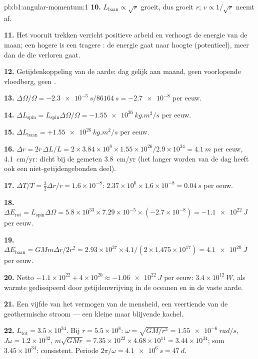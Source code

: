 \begin{solution}{pb:b1:angular-momentum:1}
\textbf{10.} $L_{\text{baan}} \propto \sqrt r$ groeit, dus groeit $r$; $v \propto
1/\sqrt r$ neemt af.

\textbf{11.} Het vooruit trekken verricht positieve arbeid en verhoogt de energie
van de maan; een hogere  is een tragere : de energie gaat naar hoogte
(potentieel), meer dan de  die verloren gaat.

\textbf{12.} Getijdenkoppeling van de aarde: dag gelijk aan maand, geen voorlopende
vloedberg, geen .

\textbf{13.} $\Delta\Omega/\Omega = -\qty{2.3e-3}{s}/\qty{86164}{s} =
\num{-2.7e-8}$ per eeuw.

\textbf{14.} $\Delta L_{\text{spin}} = L_{\text{spin}}\Delta\Omega/\Omega =
\qty{-1.55e26}{kg.m^2/s}$ per eeuw.

\textbf{15.} $\Delta L_{\text{baan}} = +\qty{1.55e26}{kg.m^2/s}$ per eeuw.

\textbf{16.} $\Delta r = 2r\,\Delta L/L = 2 \times 3.84\times10^8 \times 1.55
\times10^{26}/2.9\times10^{34} = \qty{4.1}{m}$ per eeuw, \qty{4.1}{cm/yr}:
dicht bij de gemeten \qty{3.8}{cm/yr} (het langer worden van de dag heeft ook
een niet-getijdengebonden deel).

\textbf{17.} $\Delta T/T = \tfrac32\Delta r/r = 1.6\times10^{-8}$: $2.37\times
10^6 \times 1.6\times10^{-8} = \qty{0.04}{s}$ per eeuw.

\textbf{18.} $\Delta E_{\text{rot}} = L_{\text{spin}}\Delta\Omega = 5.8\times10^{33}
\times 7.29\times10^{-5} \times (-2.7\times10^{-8}) = \qty{-1.1e22}{J}$ per
eeuw.

\textbf{19.} $\Delta E_{\text{baan}} = GMm\Delta r/2r^2 = 2.93\times10^{37}
\times 4.1/(2 \times 1.475\times10^{17}) = \qty{+4.1e20}{J}$ per eeuw.

\textbf{20.} Netto $-1.1\times10^{22} + 4\times10^{20} \approx \qty{-1.06e22}{J}$
per eeuw: $3.4\times10^{12}\ \unit{W}$, als warmte gedissipeerd door getijdenwrijving
in de oceanen en in de vaste aarde.

\textbf{21.} Een vijfde van het vermogen van de mensheid, een veertiende van de
geothermische stroom --- een kleine maar blijvende kachel.

\textbf{22.} $L_{\text{tot}} = 3.5\times10^{34}$. Bij $r = 5.5\times10^8$:
$\omega = \sqrt{GM/r^3} = \qty{1.55e-6}{rad/s}$, $J\omega = 1.2\times10^{32}$,
$m\sqrt{GMr} = 7.35\times10^{22} \times 4.68\times10^{11} = 3.44\times10^{34}$;
som $3.45\times10^{34}$: consistent. Periode $2\pi/\omega = \qty{4.1e6}{s}
= \qty{47}{d}$.


\end{solution}

